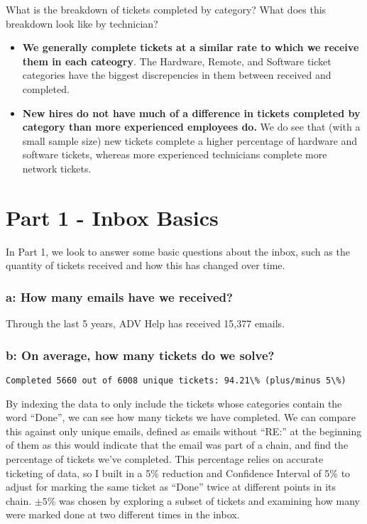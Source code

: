 \documentclass[11pt]{article}
\begin{document}
What is the breakdown of tickets completed by category? What does this
breakdown look like by technician?

\begin{itemize}
\item
  \textbf{We generally complete tickets at a similar rate to which we
  receive them in each cateogry}. The Hardware, Remote, and Software
  ticket categories have the biggest discrepencies in them between
  received and completed. 
\item
  \textbf{New hires do not have much of a difference in tickets
  completed by category than more experienced employees do.} We do see
  that (with a small sample size) new tickets complete a higher
  percentage of hardware and software tickets, whereas more experienced
  technicians complete more network tickets.
\end{itemize}


    \hypertarget{part-1---inbox-basics}{%
\section{Part 1 - Inbox Basics}\label{part-1---inbox-basics}}

In Part 1, we look to answer some basic questions about the inbox, such
as the quantity of tickets received and how this has changed over time.

\hypertarget{a-how-many-emails-have-we-received}{%
\subsubsection{a: How many emails have we
received?}\label{a-how-many-emails-have-we-received}}


    Through the last 5 years, ADV Help has received 15,377 emails.

    \hypertarget{b-on-average-how-many-tickets-do-we-solve}{%
\subsubsection{b: On average, how many tickets do we
solve?}\label{b-on-average-how-many-tickets-do-we-solve}}

    \begin{Verbatim}[commandchars=\\\{\}]
Completed 5660 out of 6008 unique tickets: 94.21\% (plus/minus 5\%)
    \end{Verbatim}

    By indexing the data to only include the tickets whose categories
contain the word ``Done'', we can see how many tickets we have
completed. We can compare this against only unique emails, defined as
emails without ``RE:'' at the beginning of them as this would indicate
that the email was part of a chain, and find the percentage of tickets
we've completed. This percentage relies on accurate ticketing of data,
so I built in a 5\% reduction and Confidence Interval of 5\% to adjust
for marking the same ticket as ``Done'' twice at different points in its
chain. \(\pm 5\%\) was chosen by exploring a subset of tickets and
examining how many were marked done at two different times in the inbox.
\end{document}
